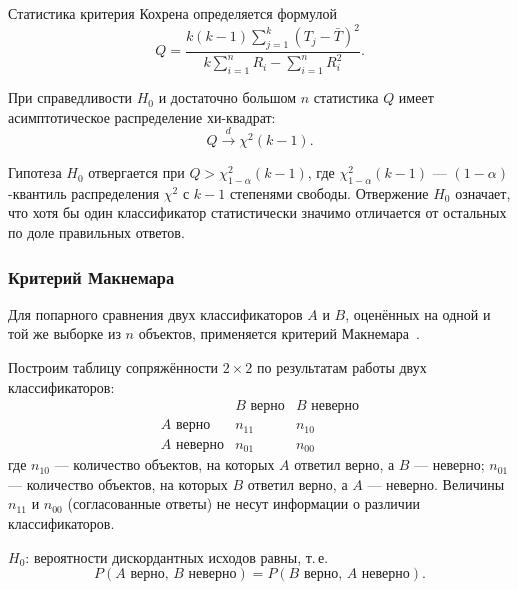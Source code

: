 Статистика критерия Кохрена определяется формулой
\begin{equation}
    Q = \frac{k(k-1)\displaystyle\sum_{j=1}^{k}(T_j - \bar{T})^{2}}
             {k\displaystyle\sum_{i=1}^{n}R_i
              - \displaystyle\sum_{i=1}^{n}R_i^{2}}.
    \label{eq:cochran-Q}
\end{equation}

При справедливости $H_0$ и достаточно большом $n$ статистика $Q$ имеет
асимптотическое распределение хи-квадрат:
\begin{equation}
    Q \xrightarrow{d} \chi^{2}(k - 1).
    \label{eq:cochran-distribution}
\end{equation}

Гипотеза $H_0$ отвергается при $Q > \chi^{2}_{1-\alpha}(k-1)$, где
$\chi^{2}_{1-\alpha}(k-1)$ --- $(1-\alpha)$-квантиль распределения
$\chi^{2}$ с $k-1$ степенями свободы. Отвержение $H_0$ означает, что
хотя бы один классификатор статистически значимо отличается от остальных
по доле правильных ответов.

\subsubsection{Критерий Макнемара}
\label{subsubsec:mcnemar}

Для попарного сравнения двух классификаторов $A$ и $B$, оценённых на
одной и той же выборке из $n$ объектов, применяется критерий
Макнемара~\cite{mcnemar1947note, dietterich1998approximate}.

Построим таблицу сопряжённости $2 \times 2$ по результатам работы
двух классификаторов:
\begin{equation}
    \begin{array}{c|cc}
          & B \text{ верно} & B \text{ неверно} \\ \hline
    A \text{ верно}   & n_{11} & n_{10} \\
    A \text{ неверно} & n_{01} & n_{00}
    \end{array}
    \label{eq:mcnemar-table}
\end{equation}
где $n_{10}$ --- количество объектов, на которых $A$ ответил верно,
а $B$ --- неверно; $n_{01}$ --- количество объектов, на которых $B$
ответил верно, а $A$ --- неверно. Величины $n_{11}$ и $n_{00}$
(согласованные ответы) не несут информации о различии классификаторов.

\begin{definition}
\label{def:mcnemar-h0}
$H_0$: вероятности дискордантных исходов равны, т.\,е.
\begin{equation}
    P(\text{$A$ верно, $B$ неверно}) = P(\text{$B$ верно, $A$ неверно}).
    \label{eq:mcnemar-h0}
\end{equation}
\end{definition}

